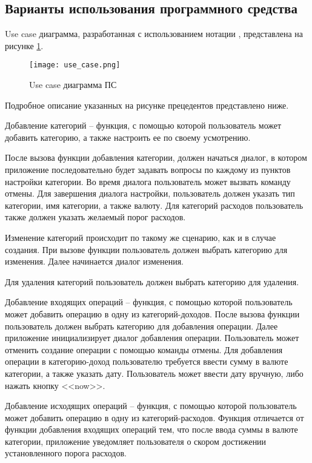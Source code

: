 \subsection{Варианты использования программного средства} 
\label{sec:domain:model:use_cases}

Use case диаграмма, разработанная с использованием нотации \linebreak \uml, представлена на рисунке \ref{fig:domain:model:use_cases:model}.

\begin{figure}[!h]
\centering
	\texttt{[image: use\_case.png]}
	\caption{Use case диаграмма ПС}
	\label{fig:domain:model:use_cases:model}
\end{figure}

Подробное описание указанных на рисунке прецедентов представлено ниже.

Добавление категорий -- функция, с помощью которой пользователь может добавить категорию, а также настроить ее по своему усмотрению. 

После вызова функции добавления категории, должен начаться диалог, в котором приложение последовательно будет задавать вопросы по каждому из пунктов настройки категории. Во время диалога пользователь может вызвать команду отмены. Для завершения диалога настройки, пользователь должен указать тип категории, имя категории, а также валюту. Для категорий расходов пользователь также должен указать желаемый порог расходов.

Изменение категорий происходит по такому же сценарию, как и в случае создания. При вызове функции пользователь должен выбрать категорию для изменения. Далее начинается диалог изменения.

Для удаления категорий пользователь должен выбрать категорию для удаления.

Добавление входящих операций -- функция, с помощью которой пользователь может добавить операцию в одну из категорий-доходов. После вызова функции пользователь должен выбрать категорию для добавления операции. Далее приложение инициализирует диалог добавления операции. Пользователь может отменить создание операции с помощью команды отмены. Для добавления операции в категорию-доход пользователю требуется ввести сумму в валюте категории, а также указать дату. Пользователь может ввести дату вручную, либо нажать кнопку <<now>>.

Добавление исходящих операций -- функция, с помощью которой пользователь может добавить операцию в одну из категорий-расходов. Функция отличается от функции добавления входящих операций тем, что после ввода суммы в валюте категории, приложение уведомляет пользователя о скором достижении установленного порога расходов.

